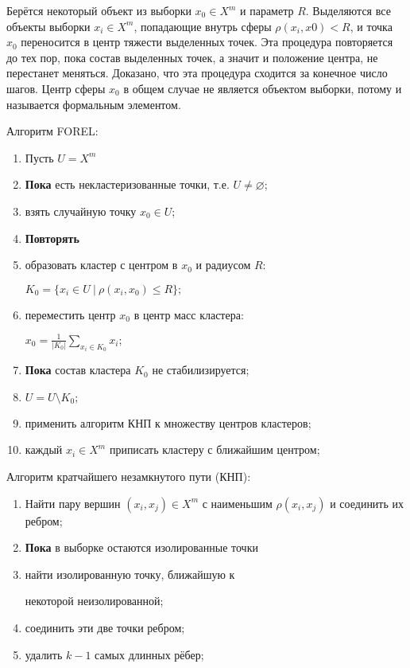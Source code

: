 \documentclass[10pt]{article}
\renewcommand{\leq}{\leqslant}
\begin{document}
Берётся некоторый объект из выборки $x_0 \in X^m$ и параметр $R$. Выделяются все объекты выборки $x_i \in X^m$, попадающие внутрь сферы $\rho(x_i, x0) < R$, 
и точка $x_0$ переносится в центр тяжести выделенных точек. Эта процедура повторяется до тех пор, пока
состав выделенных точек, а значит и положение центра, не перестанет меняться.
Доказано, что эта процедура сходится за конечное число шагов. Центр сферы $x_0$ в общем случае
не является объектом выборки, потому и называется формальным элементом.

Алгоритм FOREL:
	\begin{enumerate}
	\item Пусть $U=X^m$
	\item \textbf{Пока} есть некластеризованные точки, т.е. $U \neq \varnothing$;
	\item \quad взять случайную точку $x_0 \in U$;
	\item \quad \textbf{Повторять}
	\item \qquad образовать кластер с центром в $x_0$ и радиусом $R$:

		\qquad $K_0 = \{ x_i \in U ~|~ \rho(x_i, x_0) \leq R \};$
	\item \qquad переместить центр $x_0$ в центр масс кластера:

		\qquad $x_0 = \frac{1}{|K_0|} \sum_{x_i \in K_0} x_i;$
	\item \quad \textbf{Пока} состав кластера $K_0$ не стабилизируется;
	\item \quad $U= U \setminus K_0;$
	\item применить алгоритм КНП к множеству центров кластеров;
	\item каждый $x_i \in X^m$ приписать кластеру с ближайшим центром;
	\end{enumerate}

Алгоритм кратчайшего незамкнутого пути (КНП):
	\begin{enumerate}
	\item Найти пару вершин $(x_i, x_j) \in X^m$ с наименьшим $\rho(x_i, x_j)$ и соединить их ребром;
	\item \textbf{Пока} в выборке остаются изолированные точки
	\item \quad найти изолированную точку, ближайшую к 

		\quad некоторой неизолированной;
	\item \quad соединить эти две точки ребром;
	\item удалить $k-1$ самых длинных рёбер;
	\end{enumerate}
\end{document}
